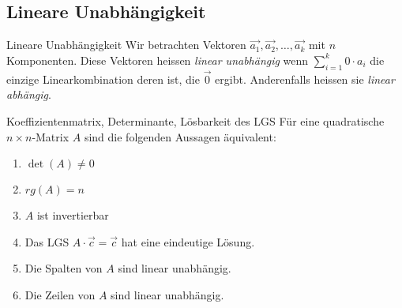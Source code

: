 \subsection{Lineare Unabhängigkeit}
    \begin{definition}{Lineare Unabhängigkeit}
        Wir betrachten Vektoren $\vec{a_1},\vec{a_2},\ldots,\vec{a_k}$ mit $n$ Komponenten.
        Diese Vektoren heissen \textit{linear unabhängig} wenn $\sum_{i=1}^k 0\cdot a_i$ die
        einzige Linearkombination deren ist, die $\vec{0}$ ergibt. 
        Anderenfalls heissen sie \textit{linear abhängig}.
    \end{definition}

    \begin{theorem}{Koeffizientenmatrix, Determinante, Lösbarkeit des LGS }
        Für eine quadratische $n\times n$-Matrix $A$ sind die folgenden Aussagen äquivalent:
        \begin{enumerate}
            \item $\det(A)\neq 0$
            \item $rg(A)=n$
            \item $A$ ist invertierbar
            \item Das LGS $A\cdot\vec{c}=\vec{c}$ hat eine eindeutige Lösung.
            \item Die Spalten von $A$ sind linear unabhängig.
            \item Die Zeilen von $A$ sind linear unabhängig.
        \end{enumerate}
    \end{theorem}